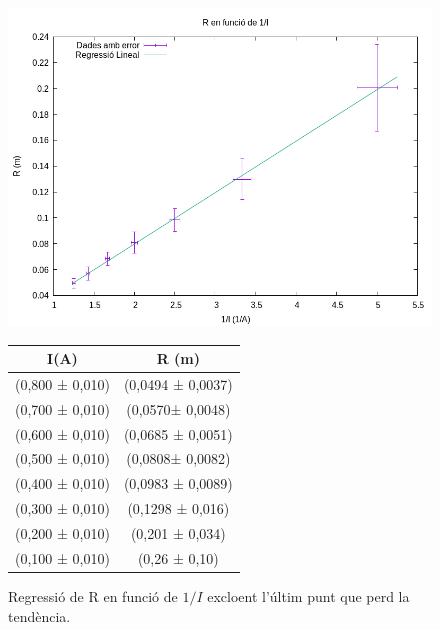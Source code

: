 \documentclass[11pt]{article}
\begin{document}
\begin{figure}[h]
    \centering
    \begin{minipage}{0.45\textwidth}
        \centering
        \includegraphics[width=\textwidth]{RvsI.png}
        \caption{Regressió de R en funció de $1/I$ excloent l'últim punt que perd la tendència.}
        \label{fig: RvsI}
    \end{minipage}
    \hfill
    \begin{minipage}{0.45\textwidth} 
        \centering
        \begin{tabular}{|c|c|}
            \hline
            I(A)	&	R (m)	\\\hline
            (0,800 ± 0,010)	&	(0,0494 ± 0,0037)	\\\hline
            (0,700 ± 0,010)	&	(0,0570± 0,0048)	\\\hline
            (0,600 ± 0,010)	&	(0,0685 ± 0,0051)	\\\hline
            (0,500 ± 0,010)	&	(0,0808± 0,0082)	\\\hline
            (0,400 ± 0,010)	&	(0,0983 ± 0,0089)	\\\hline
            (0,300 ± 0,010)	&	(0,1298 ± 0,016)	\\\hline
            (0,200 ± 0,010)	&	(0,201 ± 0,034)	\\\hline
            (0,100 ± 0,010)	&	(0,26 ± 0,10)	\\\hline
            
        \end{tabular}
        \label{tab:RvsI}
    \end{minipage}
\end{figure}
\end{document}
